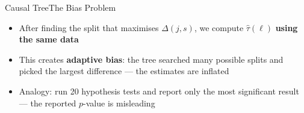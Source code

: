 \documentclass[hyperref={pdfpagelabels=false}]{beamer}
\begin{document}
\begin{frame}{Causal Tree}{The Bias Problem}
	\begin{itemize}
		\item After finding the split that maximises $\Delta(j,s)$, we compute $\hat{\tau}(\ell)$ \textbf{using the same data}
		\vspace{0.2cm}
		\item This creates \textbf{adaptive bias}: the tree searched many possible splits and picked the largest difference --- the estimates are inflated
		\vspace{0.2cm}
		\item Analogy: run 20 hypothesis tests and report only the most significant result --- the reported $p$-value is misleading
	\end{itemize}
	\vspace{0.3cm}
	\begin{center}
	\end{center}
\end{frame}
\end{document}
